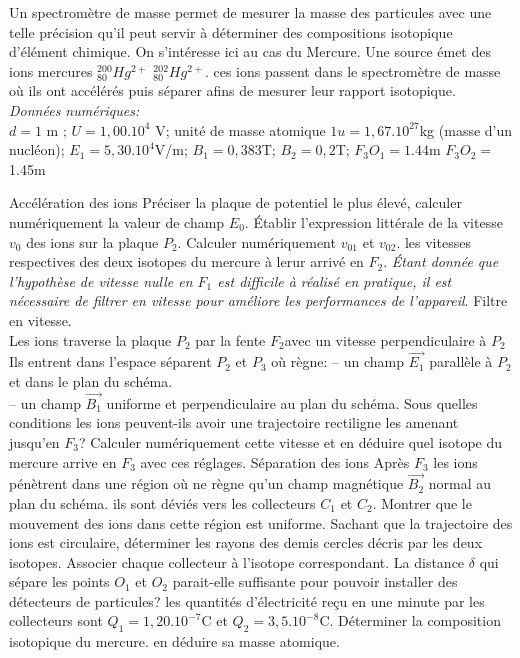 \begin{Exercise}[title=(*) Spectromètre de masse ]
	\begin{minipage}{.45\linewidth}
	Un spectromètre de masse permet de mesurer la masse des particules avec une telle précision qu'il peut servir à déterminer des compositions isotopique d'élément chimique. On s'intéresse ici au cas du Mercure.
	Une source émet des ions mercures $^{200}_{80} Hg^{2+}$ $^{202}_{80}Hg^{2+}$. ces ions passent dans le spectromètre de masse où ils ont accélérés puis séparer afins de mesurer leur rapport isotopique.\\
	\emph{Données numériques:} \\
	$d=1$ m ; $U= 1,00.10^4$ V; unité de masse atomique $1u=1,67.10^{27}$kg (masse d'un nucléon); $E_1=5,30.10^4$V/m; $B_1=0,383$T; $B_2=0,2$T; $F_3O_1=1.44$m $F_3O_2=$1.45m
	\end{minipage}\hspace{.05\linewidth}
	\begin{minipage}{0.45\textwidth}
		
	\end{minipage}
		\Question Accélération des ions
		\subQuestion Préciser la plaque de potentiel le plus élevé, calculer numériquement la valeur de champ $E_0$.
		\subQuestion Établir l'expression littérale de la vitesse $v_0$ des ions sur la plaque $P_2$.
		\subQuestion Calculer numériquement $v_01$ et $v_02$. les vitesses respectives des deux isotopes du mercure à lerur arrivé en $F_2$.
		\emph{Étant donnée que l'hypothèse de vitesse nulle en $F_1$ est difficile à réalisé en pratique,
                   il est nécessaire de filtrer en vitesse pour améliore les performances  de l'appareil}.
		\Question Filtre en vitesse.\\
		Les ions traverse la plaque $P_2$ par la fente $F_2$avec un vitesse perpendiculaire à $P_2$ Ils entrent dans l'espace séparent $P_2$ et $P_3$ où règne:
		-- un champ $\vec{E_1}$ parallèle à $P_2$ et dans le plan du schéma. \\
		-- un champ $\vec{B_1}$ uniforme et perpendiculaire au plan du schéma.
		\subQuestion Sous quelles conditions les ions peuvent-ils avoir une trajectoire rectiligne les amenant jusqu'en $F_3$?
		\subQuestion Calculer numériquement cette vitesse et en déduire quel isotope du mercure arrive en $F_3$ avec ces réglages.
		\Question Séparation des ions
		Après $F_3$ les ions pénètrent dans une région où ne règne qu'un champ magnétique $\vec{B_2}$ normal au plan du schéma. ils sont déviés vers les collecteurs $C_1$ et $C_2$.
		\subQuestion Montrer que le mouvement des ions dans cette région est uniforme.
		\subQuestion Sachant que la trajectoire des ions est circulaire, déterminer les rayons des  demis cercles décris par les deux isotopes.
		\subQuestion Associer chaque collecteur à l'isotope correspondant.
		\subQuestion La distance $\delta$ qui sépare les points $O_1$ et $O_2$ parait-elle suffisante pour pouvoir installer des détecteurs de particules?
		\subQuestion les quantités d'électricité reçu en une minute par les collecteurs sont $Q_1=1,20.10^{-7}$C et $Q_2=3,5.10^{-8}$C. Déterminer la composition isotopique du mercure. en déduire sa masse atomique.
\end{Exercise}

